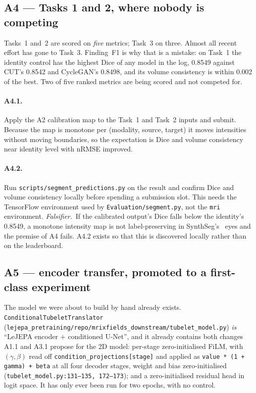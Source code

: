 \documentclass[11pt,a4paper]{article}
\newcommand{\rmse}{nRMSE}
\newcommand{\fals}{\textit{Falsifier.}\ }
\begin{document}
\subsection{A4 --- Tasks 1 and 2, where nobody is competing}
\label{sec:A4}

Tasks~1 and~2 are scored on \emph{five} metrics; Task~3 on three. Almost all recent effort has gone to
Task~3. Finding~F1 is why that is a mistake: on Task~1 the identity control has the highest Dice of any
model in the log, \num{0.8549} against CUT's \num{0.8542} and CycleGAN's \num{0.8498}, and its volume
consistency is within \num{0.002} of the best. Two of five ranked metrics are being scored and not
competed for.

\paragraph{A4.1.} Apply the A2 calibration map to the Task~1 and Task~2 inputs and submit. Because the
map is monotone per (modality, source, target) it moves intensities without moving boundaries, so the
expectation is Dice and volume consistency near identity level with \rmse{} improved.

\paragraph{A4.2.} Run \texttt{scripts/segment\_predictions.py} on the result and confirm Dice and volume
consistency locally before spending a submission slot. This needs the TensorFlow environment used by
\texttt{Evaluation/segment.py}, not the \texttt{mri} environment.
\fals If the calibrated output's Dice falls below the identity's \num{0.8549}, a monotone intensity map
is not label-preserving in SynthSeg's~\cite{billot2023synthseg} eyes and the premise of A4 fails. A4.2
exists so that this is discovered locally rather than on the leaderboard.

\subsection{A5 --- encoder transfer, promoted to a first-class experiment}
\label{sec:A5}

The model we were about to build by hand already exists. \texttt{ConditionalTubeletTranslator}
(\texttt{lejepa\_pretraining/repo/mrixfields\_downstream/tubelet\_model.py}) \emph{is} ``LeJEPA encoder
$+$ conditioned U-Net'', and it already contains both changes A1.1 and A3.1 propose for the 2D model:
per-stage zero-initialised FiLM, with $(\gamma, \beta)$ read off
\texttt{condition\_projections[stage]} and applied as \texttt{value * (1 + gamma) + beta} at all four
decoder stages, weight and bias zero-initialised (\texttt{tubelet\_model.py:131--135, 172--173}); and a
zero-initialised residual head in logit space. It has only ever been run for two epochs, with no control.
\end{document}

